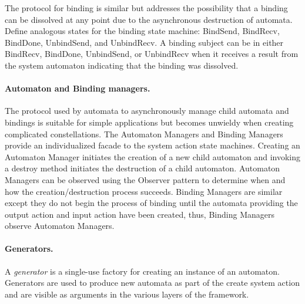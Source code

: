 The protocol for binding is similar but addresses the possibility that a binding can be dissolved at any point due to the asynchronous destruction of automata.
Define analogous states for the binding state machine: BindSend, BindRecv, BindDone, UnbindSend, and UnbindRecv.
A binding subject can be in either BindRecv, BindDone, UnbindSend, or UnbindRecv when it receives a result from the system automaton indicating that the binding was dissolved.

\paragraph{Automaton and Binding managers.}
The protocol used by automata to asynchronously manage child automata and bindings is suitable for simple applications but becomes unwieldy when creating complicated constellations.
The Automaton Managers and Binding Managers provide an individualized facade to the system action state machines.
Creating an Automaton Manager initiates the creation of a new child automaton and invoking a destroy method initiates the destruction of a child automaton.
Automaton Managers can be observed using the Observer pattern to determine when and how the creation/destruction process succeeds.
Binding Managers are similar except they do not begin the process of binding until the automata providing the output action and input action have been created, thus, Binding Managers observe Automaton Managers.

\paragraph{Generators.}
A \emph{generator} is a single-use factory for creating an instance of an automaton.
Generators are used to produce new automata as part of the create system action and are visible as arguments in the various layers of the framework.
